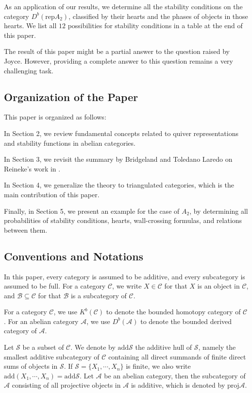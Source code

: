 \documentclass[a4paper,12pt]{amsart}
\newcommand{\rep}{\mathrm{rep}}
\newcommand{\add}{\mathrm{add}}
\newcommand{\proj}{\mathrm{proj}}
\begin{document}
As an application of our results, we determine all the stability conditions on the category $D^b(\rep A_2)$, classified by their hearts and the phases of objects in those hearts. We list all $12$ possibilities for stability conditions in a table at the end of this paper.

The result of this paper might be a partial answer to the question \cite[Problem 7.1]{Joy2008} raised by Joyce. However, providing a complete answer to this question remains a very challenging task.

\subsection{Organization of the Paper}
    This paper is organized as follows: 
    
    In Section 2, we review fundamental concepts related to quiver representations and stability functions in abelian categories. 
    
    In Section 3, we revisit the summary by Bridgeland and Toledano Laredo on Reineke’s work in \cite{BT2012}. 
    
    In Section 4, we generalize the theory to triangulated categories, which is the main contribution of this paper. 
    
    Finally, in Section 5, we present an example for the case of $A_2$, by determining all probabilities of stability conditions, hearts, wall-crossing formulas, and relations between them.

\subsection{Conventions and Notations}
    In this paper, every category is assumed to be additive, and every subcategory is assumed to be full. For a category $\mathcal{C}$, we write $X\in\mathcal{C}$ for that $X$ is an object in $\mathcal{C}$, and $\mathcal{B}\subseteq\mathcal{C}$ for that $\mathcal{B}$ is a subcategory of $\mathcal{C}$.

    For a category $\mathcal{C}$, we use $K^b(\mathcal{C})$ to denote the bounded homotopy category of $\mathcal{C}$. For an abelian category $\mathcal{A}$, we use $D^b(\mathcal{A})$ to denote the bounded derived category of $\mathcal{A}$.

    Let $\mathcal{S}$ be a subset of $\mathcal{C}$. We denote by $\add\mathcal{S}$ the additive hull of $\mathcal{S}$, namely the smallest additive subcategory of $\mathcal{C}$ containing all direct summands of finite direct sums of objects in $\mathcal{S}$. If $\mathcal{S}=\{X_1,\cdots,X_n\}$ is finite, we also write $\add(X_1,\cdots,X_n)=\add\mathcal{S}$. Let $\mathcal{A}$ be an abelian category, then the subcategory of $\mathcal{A}$ consisting of all projective objects in $\mathcal{A}$ is additive, which is denoted by $\proj\mathcal{A}$. 
\end{document}
